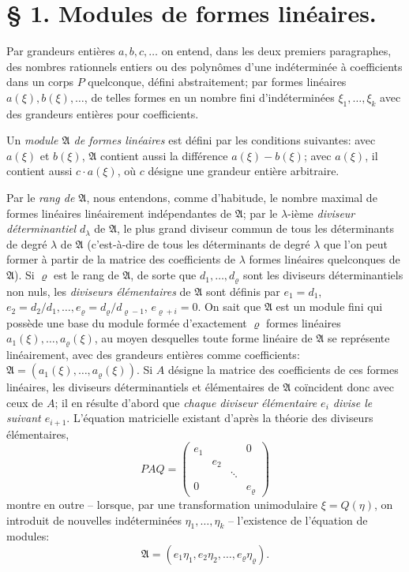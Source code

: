 \documentclass[11pt]{article}
\providecommand{\Amod}{\mathfrak A}
\begin{document}
\section*{\S{} 1. Modules de formes linéaires.}

Par grandeurs entières $a,b,c,\ldots$ on entend, dans les deux premiers paragraphes, des nombres rationnels entiers ou des polynômes d'une indéterminée à coefficients dans un corps $P$ quelconque, défini abstraitement; par formes linéaires $a(\xi),b(\xi),\ldots$, de telles formes en un nombre fini d'indéterminées $\xi_1,\ldots,\xi_k$ avec des grandeurs entières pour coefficients.

Un \emph{module $\Amod$ de formes linéaires} est défini par les conditions suivantes: avec $a(\xi)$ et $b(\xi)$, $\Amod$ contient aussi la différence $a(\xi)-b(\xi)$; avec $a(\xi)$, il contient aussi $c\cdot a(\xi)$, où $c$ désigne une grandeur entière arbitraire.

Par le \emph{rang de $\Amod$}, nous entendons, comme d'habitude, le nombre maximal de formes linéaires linéairement indépendantes de $\Amod$; par le $\lambda$-ième \emph{diviseur déterminantiel} $d_\lambda$ de $\Amod$, le plus grand diviseur commun de tous les déterminants de degré $\lambda$ de $\Amod$ (c'est-à-dire de tous les déterminants de degré $\lambda$ que l'on peut former à partir de la matrice des coefficients de $\lambda$ formes linéaires quelconques de $\Amod$). Si $\varrho$ est le rang de $\Amod$, de sorte que $d_1,\ldots,d_\varrho$ sont les diviseurs déterminantiels non nuls, les \emph{diviseurs élémentaires} de $\Amod$ sont définis par $e_1=d_1$, $e_2=d_2/d_1,\ldots,e_\varrho=d_\varrho/d_{\varrho-1}$, $e_{\varrho+i}=0$. On sait que $\Amod$ est un module fini qui possède une base du module formée d'exactement $\varrho$ formes linéaires $a_1(\xi),\ldots,a_\varrho(\xi)$, au moyen desquelles toute forme linéaire de $\Amod$ se représente linéairement, avec des grandeurs entières comme coefficients: $\Amod=(a_1(\xi),\ldots,a_\varrho(\xi))$. Si $A$ désigne la matrice des coefficients de ces formes linéaires, les diviseurs déterminantiels et élémentaires de $\Amod$ coïncident donc avec ceux de $A$; il en résulte d'abord que \emph{chaque diviseur élémentaire $e_i$ divise le suivant $e_{i+1}$}. L'équation matricielle existant d'après la théorie des diviseurs élémentaires,
\[
 P A Q=\begin{pmatrix}
 e_1&&&0\\
 &e_2&&\\
 &&\ddots&\\
 0&&&e_\varrho
 \end{pmatrix}
\]
montre en outre -- lorsque, par une transformation unimodulaire $\xi=Q(\eta)$, on introduit de nouvelles indéterminées $\eta_1,\ldots,\eta_k$ -- l'existence de l'équation de modules:
\begin{equation}
 \Amod=(e_1\eta_1,e_2\eta_2,\ldots,e_\varrho\eta_\varrho).
\tag{1}
\end{equation}
\end{document}
